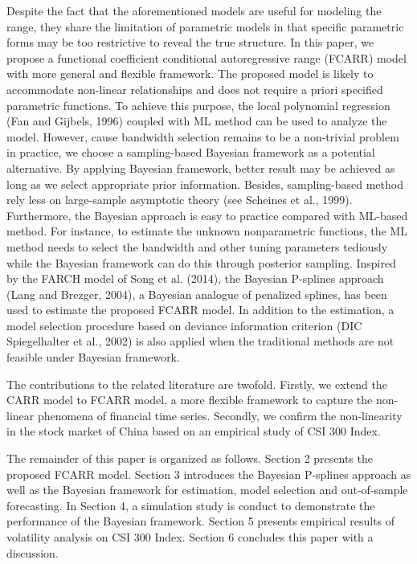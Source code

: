 \documentclass[
journal=jacsat, %
manuscript=article]{achemso}
\begin{document}
\begin{CJK*}{UTF8}{song}
Despite the fact that the aforementioned models are useful for modeling the range, they share the limitation of parametric models in that specific parametric forms may be too restrictive to reveal the true structure. In this paper, we propose a functional coefficient conditional autoregressive range (FCARR) model with more general and flexible framework. The proposed model is likely to accommodate non-linear relationships and does not require a priori specified parametric functions. To achieve this purpose, the local polynomial regression (Fan and Gijbels, 1996) coupled with ML method can be used to analyze the model. However, cause bandwidth selection remains to be a non-trivial problem in practice, we choose a sampling-based Bayesian framework as a potential alternative. By applying Bayesian framework, better result may be achieved as long as we select appropriate prior information. Besides, sampling-based method rely less on large-sample asymptotic theory (see Scheines et al., 1999). Furthermore, the Bayesian approach is easy to practice compared with ML-based method. For instance, to estimate the unknown nonparametric functions, the ML method needs to select the bandwidth and other tuning parameters tediously while the Bayesian framework can do this through posterior sampling. Inspired by the FARCH model of Song et al. (2014), the Bayesian P-splines approach (Lang and Brezger, 2004), a Bayesian analogue of penalized splines, has been used to estimate the proposed FCARR model. In addition to the estimation, a model selection procedure based on deviance information criterion (DIC Spiegelhalter et al., 2002) is also applied when the traditional methods are not feasible under Bayesian framework.

The contributions to the related literature are twofold. Firstly, we extend the CARR model to FCARR model, a more flexible framework to capture the non-linear phenomena of financial time series. Secondly, we confirm the non-linearity in the stock market of China based on an empirical study of CSI 300 Index.

The remainder of this paper is organized as follows. Section 2 presents the proposed FCARR model. Section 3 introduces the Bayesian P-splines approach as well as the Bayesian framework for estimation, model selection and out-of-sample forecasting. In Section 4, a simulation study is conduct to demonstrate the performance of the Bayesian framework. Section 5 presents empirical results of volatility analysis on CSI 300 Index. Section 6 concludes this paper with a discussion.



\end{CJK*}
\end{document}
